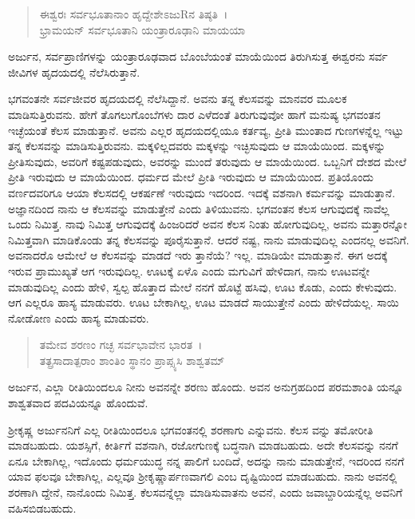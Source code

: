 \begin{verse}
ಈಶ್ವರಃ ಸರ್ವಭೂತಾನಾಂ ಹೃದ್ದೇಶೇಽಜುRನ ತಿಷ್ಠತಿ~।\\ಭ್ರಾಮಯನ್ ಸರ್ವಭೂತಾನಿ ಯಂತ್ರಾರೂಢಾನಿ ಮಾಯಯಾ 
\end{verse}

{\small ಅರ್ಜುನ, ಸರ್ವಪ್ರಾಣಿಗಳನ್ನು ಯಂತ್ರಾರೂಢವಾದ ಬೊಂಬೆಯಂತೆ ಮಾಯೆಯಿಂದ ತಿರುಗಿಸುತ್ತ ಈಶ್ವರನು ಸರ್ವ ಜೀವಿಗಳ ಹೃದಯದಲ್ಲಿ ನೆಲೆಸಿರುತ್ತಾನೆ.}

ಭಗವಂತನೇ ಸರ್ವಜೀವರ ಹೃದಯದಲ್ಲಿ ನೆಲೆಸಿದ್ದಾನೆ. ಅವನು ತನ್ನ ಕೆಲಸವನ್ನು ಮಾನವರ ಮೂಲಕ ಮಾಡಿಸುತ್ತಿರುವನು. ಹೇಗೆ ತೊಗಲುಗೊಂಬೆಗಳು ದಾರ ಎಳೆದಂತೆ ತಿರುಗುವುವೋ ಹಾಗೆ ಮನುಷ್ಯ ಭಗವಂತನ ಇಚ್ಛೆಯಂತೆ ಕೆಲಸ ಮಾಡುತ್ತಾನೆ. ಅವನು ಎಲ್ಲರ ಹೃದಯದಲ್ಲಿಯೂ ಕರ್ತವ್ಯ, ಪ್ರೀತಿ ಮುಂತಾದ ಗುಣಗಳನ್ನೆಲ್ಲ ಇಟ್ಟು ತನ್ನ ಕೆಲಸವನ್ನು ಮಾಡಿಸುತ್ತಿರುವನು. ಮಕ್ಕಳಿಲ್ಲದವರು ಮಕ್ಕಳನ್ನು ಇಚ್ಛಿಸುವುದು ಆ ಮಾಯೆಯಿಂದ. ಮಕ್ಕಳನ್ನು ಪ್ರೀತಿಸುವುದು, ಅವರಿಗೆ ಕಷ್ಟಪಡುವುದು, ಅವರನ್ನು ಮುಂದೆ ತರುವುದು ಆ ಮಾಯೆಯಿಂದ. ಒಬ್ಬನಿಗೆ ದೇಶದ ಮೇಲೆ ಪ್ರೀತಿ ಇರುವುದು ಆ ಮಾಯೆಯಿಂದ. ಧರ್ಮದ ಮೇಲೆ ಪ್ರೀತಿ ಇರುವುದು ಆ ಮಾಯೆಯಿಂದ. ಪ್ರತಿಯೊಂದು ವರ್ಣದವರಿಗೂ ಆಯಾ ಕೆಲಸದಲ್ಲಿ ಆಕರ್ಷಣೆ ಇರುವುದು ಇದರಿಂದ. ಇದಕ್ಕೆ ವಶನಾಗಿ ಕರ್ಮವನ್ನು ಮಾಡುತ್ತಾನೆ. ಅಜ್ಞಾನದಿಂದ ನಾನು ಆ ಕೆಲಸವನ್ನು ಮಾಡುತ್ತೇನೆ ಎಂದು ತಿಳಿಯುವನು. ಭಗವಂತನ ಕೆಲಸ ಆಗುವುದಕ್ಕೆ ನಾವೆಲ್ಲ ಒಂದು ನಿಮಿತ್ತ. ನಾವು ನಿಮಿತ್ತ ಆಗುವುದಕ್ಕೆ ಹಿಂಜರಿದರೆ ಅವನ ಕೆಲಸ ನಿಂತು ಹೋಗುವುದಿಲ್ಲ, ಅವನು ಮತ್ತಾರನ್ನೋ ನಿಮಿತ್ತವಾಗಿ ಮಾಡಿಕೊಂಡು ತನ್ನ ಕೆಲಸವನ್ನು ಪೂರೈಸುತ್ತಾನೆ. ಆದರೆ ನಷ್ಟ, ನಾನು ಮಾಡುವುದಿಲ್ಲ ಎಂದನಲ್ಲ ಅವನಿಗೆ. ಅವನಾದರೊ ಆಮೇಲೆ ಆ ಕೆಲಸವನ್ನು ಮಾಡದೆ ಇರು ತ್ತಾನೆಯೆ? ಇಲ್ಲ. ಮಾಡಿಯೇ ಮಾಡುತ್ತಾನೆ. ಈಗ ಅದಕ್ಕೆ ಇರುವ ಪ್ರಾಮುಖ್ಯತೆ ಆಗ ಇರುವುದಿಲ್ಲ. ಊಟಕ್ಕೆ ಏಳೊ ಎಂದು ಮಗುವಿಗೆ ಹೇಳಿದಾಗ, ನಾನು ಊಟವನ್ನೇ ಮಾಡುವುದಿಲ್ಲ ಎಂದು ಹೇಳಿ, ಸ್ವಲ್ಪ ಹೊತ್ತಾದ ಮೇಲೆ ನನಗೆ ಹೊಟ್ಟೆ ಹಸಿವು, ಊಟ ಕೊಡು, ಎಂದು ಕೇಳುವುದು. ಆಗ ಎಲ್ಲರೂ ಹಾಸ್ಯ ಮಾಡುವರು. ಊಟ ಬೇಕಾಗಿಲ್ಲ, ಊಟ ಮಾಡದೆ ಸಾಯುತ್ತೇನೆ ಎಂದು ಹೇಳಿದೆಯಲ್ಲ. ಸಾಯಿ ನೋಡೋಣ ಎಂದು ಹಾಸ್ಯ ಮಾಡುವರು.

\begin{verse}
ತಮೇವ ಶರಣಂ ಗಚ್ಛ ಸರ್ವಭಾವೇನ ಭಾರತ~।\\ತತ್ಪ್ರಸಾದಾತ್ಪರಾಂ ಶಾಂತಿಂ ಸ್ಥಾನಂ ಪ್ರಾಪ್ಸ್ಯಸಿ ಶಾಶ್ವತಮ್ 
\end{verse}

{\small ಅರ್ಜುನ, ಎಲ್ಲಾ ರೀತಿಯಿಂದಲೂ ನೀನು ಅವನನ್ನೇ ಶರಣು ಹೊಂದು. ಅವನ ಅನುಗ್ರಹದಿಂದ ಪರಮಶಾಂತಿ ಯನ್ನೂ ಶಾಶ್ವತವಾದ ಪದವಿಯನ್ನೂ ಹೊಂದುವೆ.}

ಶ‍್ರೀಕೃಷ್ಣ ಅರ್ಜುನನಿಗೆ ಎಲ್ಲ ರೀತಿಯಿಂದಲೂ ಭಗವಂತನಲ್ಲಿ ಶರಣಾಗು ಎನ್ನುವನು. ಕೆಲಸ ವನ್ನು ತಮೋರೀತಿ ಮಾಡಬಹುದು. ಯಶಸ್ಸಿಗೆ, ಕೀರ್ತಿಗೆ ವಶನಾಗಿ, ರಜೋಗುಣಕ್ಕೆ ಬದ್ಧನಾಗಿ ಮಾಡಬಹುದು. ಅದೇ ಕೆಲಸವನ್ನು ನನಗೆ ಏನೂ ಬೇಕಾಗಿಲ್ಲ, ಇದೊಂದು ಧರ್ಮಯುದ್ಧ ನನ್ನ ಪಾಲಿಗೆ ಬಂದಿದೆ, ಅದನ್ನು ನಾನು ಮಾಡುತ್ತೇನೆ, ಇದರಿಂದ ನನಗೆ ಯಾವ ಫಲವೂ ಬೇಕಾಗಿಲ್ಲ, ಎಲ್ಲವೂ ಶ‍್ರೀಕೃಷ್ಣಾರ್ಪಣವಾಗಲಿ ಎಂಬ ದೃಷ್ಟಿಯಿಂದ ಮಾಡಬಹುದು. ನಾನು ಅವನಲ್ಲಿ ಶರಣಾಗಿ ದ್ದೇನೆ, ನಾನೊಂದು ನಿಮಿತ್ತ. ಕೆಲಸವನ್ನೆಲ್ಲಾ ಮಾಡಿಸುವಾತನು ಅವನೆ, ಎಂದು ಜವಾಬ್ದಾರಿಯನ್ನೆಲ್ಲ ಅವನಿಗೆ ವಹಿಸಬಿಡಬಹುದು.

